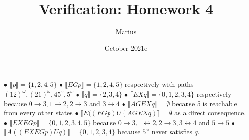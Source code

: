 \documentclass{article}
\title{Verification: Homework 4}
\author{Marius }
\date{October 2021e}
\newcommand{\br}[1]{\ensuremath{\llbracket #1 \rrbracket}} %
\begin{document}
\maketitle
\noindent
$\bullet$ $\br{p}= \{1,2,4,5\}$\newline
$\bullet$ $\br{EGp}= \{1,2,4,5\}$ respectively with paths $(12)^\omega,(21)^\omega,45^\omega,5^\omega$\newline
$\bullet$ $\br{q}= \{2,3,4\}$\newline
$\bullet$ $\br{EXq}= \{0,1,2,3,4\}$ respectively because $0 \rightarrow 3, 1 \rightarrow 2, 2 \rightarrow 3$ and $3 \leftrightarrow 4$\newline
$\bullet$ $\br{AGEXq}= \emptyset$ because 5 is reachable from every other states\newline
$\bullet$ $\br{E((EGp)U(AGEXq)}= \emptyset$ as a direct consequence.\newline
$\bullet$ $\br{EXEGp}= \{0,1,2,3,4,5\}$ because $0 \rightarrow 3, 1 \leftrightarrow 2, 2 \rightarrow 3, 3 \leftrightarrow 4$ and $5 \rightarrow 5$\newline
$\bullet$ $\br{A((EXEGp)Uq)}= \{0,1,2,3,4\}$ because $5^\omega$ never satisfies $q$. \newline	



\newpage
\end{document}
